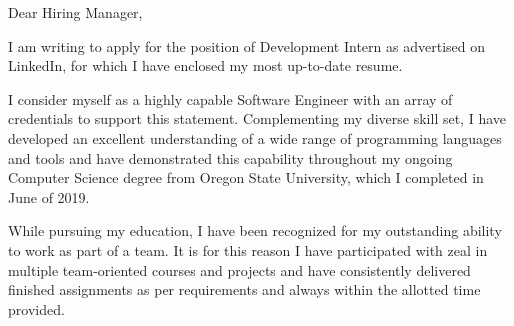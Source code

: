 \documentclass[11pt]{letter} %
\begin{document}

\begin{letter}{}



\signature{Megan Goossens} %


\opening{Dear Hiring Manager,} 
 
I am writing to apply for the position of {Development Intern} as advertised on
{LinkedIn}, for which I have enclosed my most up-to-date resume.

I consider myself as a highly capable Software Engineer with an array of
credentials to support this statement. Complementing my diverse skill set, I
have developed an excellent understanding of a wide range of programming
languages and tools and have demonstrated this capability throughout my ongoing
Computer Science degree from Oregon State University, which I completed in June
of 2019.

While pursuing my education, I have been recognized for my outstanding ability
to work as part of a team. It is for this reason I have participated with zeal
in multiple team-oriented courses and projects and have consistently delivered
finished assignments as per requirements and always within the allotted time
provided.


\end{letter}
\end{document}
